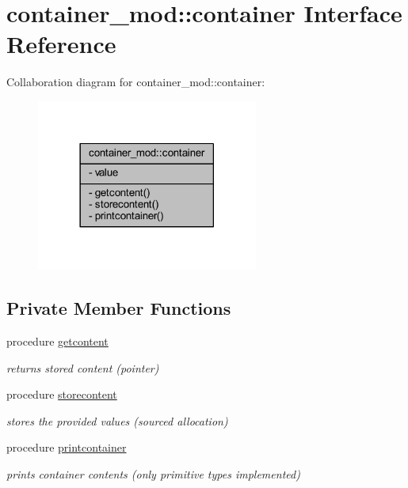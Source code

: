 \hypertarget{structcontainer__mod_1_1container}{}\section{container\+\_\+mod\+:\+:container Interface Reference}
\label{structcontainer__mod_1_1container}


Collaboration diagram for container\+\_\+mod\+:\+:container\+:
\nopagebreak
\begin{figure}[H]
\begin{center}
\leavevmode
\includegraphics[width=206pt]{structcontainer__mod_1_1container__coll__graph}
\end{center}
\end{figure}
\subsection*{Private Member Functions}
\begin{DoxyCompactItemize}
\item 
procedure \mbox{\hyperlink{structcontainer__mod_1_1container_abe1540dea98e715a935b91c662a2d81a}{getcontent}}
\begin{DoxyCompactList}\small\item\em returns stored content (pointer) \end{DoxyCompactList}\item 
procedure \mbox{\hyperlink{structcontainer__mod_1_1container_a15e46e6f457bb49604ccf191780f6638}{storecontent}}
\begin{DoxyCompactList}\small\item\em stores the provided values (sourced allocation) \end{DoxyCompactList}\item 
procedure \mbox{\hyperlink{structcontainer__mod_1_1container_ac62ed00e4c79b7c758a5efbc9cc1909a}{printcontainer}}
\begin{DoxyCompactList}\small\item\em prints container contents (only primitive types implemented) \end{DoxyCompactList}\end{DoxyCompactItemize}
